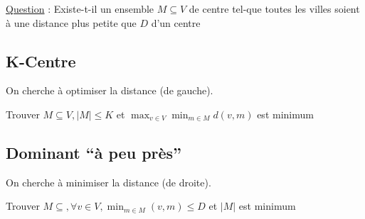 \documentclass{article}
\begin{document}
    \underline{Question} : Existe-t-il un ensemble $M \subseteq V$ de centre
                           tel-que toutes les villes soient à une distance
                           plus petite que $D$ d'un centre

    \subsection{K-Centre}

      On cherche à optimiser la distance (de gauche).

      Trouver $M \subseteq V, |M| \leq K$ et
      $\max_{v\in V} \min_{m \in M} d(v, m)$ est minimum

    \subsection{Dominant ``à peu près''}

      On cherche à minimiser la distance (de droite).

      Trouver $M \subseteq, \forall v \in V, \min_{m \in M}(v, m) \leq D$
      et $|M|$ est minimum
\end{document}
